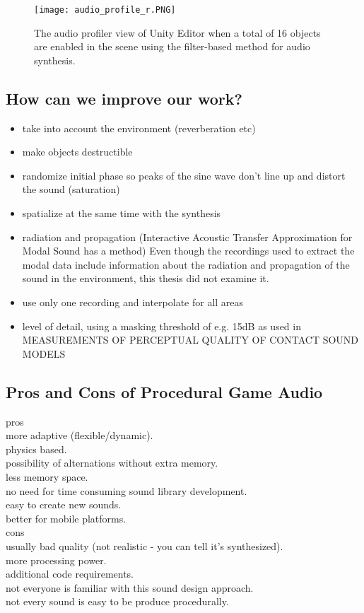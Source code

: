 \begin{figure}[H]
  \centering
    \texttt{[image: audio\_profile\_r.PNG]}
      \caption{The audio profiler view of Unity\textsuperscript{\textregistered} Editor when a total of 16 objects are enabled in the scene using the filter-based method for audio synthesis.}
      \label{fig:audio_profile}
\end{figure}

\subsection{How can we improve our work?}
\begin{itemize}
\item take into account the environment (reverberation etc)
\item make objects destructible
\item randomize initial phase so peaks of the sine wave don't line up and distort the sound (saturation)
\item spatialize at the same time with the synthesis
\item radiation and propagation (Interactive Acoustic Transfer Approximation for Modal Sound has a method)
Even though the recordings used to extract the modal data include information about the radiation and propagation of the sound in the environment, this thesis did not examine it.
\item use only one recording and interpolate for all areas
\item level of detail, using a masking threshold of e.g. 15dB as used in MEASUREMENTS OF PERCEPTUAL QUALITY OF CONTACT SOUND MODELS
\end{itemize}

\subsection{Pros and Cons of Procedural Game Audio}
pros\\
more adaptive (flexible/dynamic).\\
physics based.\\
possibility of alternations without extra memory.\\
less memory space.\\
no need for time consuming sound library development.\\
easy to create new sounds.\\
better for mobile platforms.\\

cons\\
usually bad quality (not realistic - you can tell it's synthesized).\\
more processing power.\\
additional code requirements.\\
not everyone is familiar with this sound design approach.\\
not every sound is easy to be produce procedurally.\\
